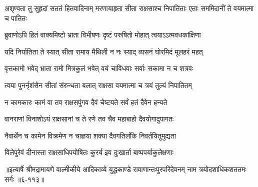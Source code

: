 \threelineshloka
{अशृण्वता तु सुहृदां सततं हितवादिनाम्}
{मरणायाहृता सीता राक्षसाश्च निपातिताः}
{एताः सममिदानीं ते वयमात्मा च पातितः} %

\twolineshloka
{ब्रुवाणोऽपि हितं वाक्यमिष्टो भ्राता विभीषणः}
{दृष्टं परुषितो मोहात् त्वयाऽऽत्मवधकांक्षिणा} %

\twolineshloka
{यदि निर्यातिता ते स्यात् सीता रामाय मैथिली}
{न नः स्याद् व्यसनं घोरमिदं मूलहरं महत्} %

\twolineshloka
{वृत्तकामो भवेद् भ्राता रामो मित्रकुलं भवेत्}
{वयं चाविधवाः सर्वाः सकामा न च शत्रवः} %

\twolineshloka
{त्वया पुनर्नृशंसेन सीतां संरुन्धता बलात्}
{राक्षसा वयमात्मा च त्रयं तुल्यं निपातितम्} %

\twolineshloka
{न कामकारः कामं वा तव राक्षसपुंगव}
{दैवं चेष्टयते सर्वं हतं दैवेन हन्यते} %

\twolineshloka
{वानराणां विनाशोऽयं राक्षसानां च ते रणे}
{तव चैव महाबाहो दैवयोगादुपागतः} %

\twolineshloka
{नैवार्थेन च कामेन विक्रमेण न चाज्ञया}
{शक्या दैवगतिर्लोके निवर्तयितुमुद्यता} %

\twolineshloka
{विलेपुरेवं दीनास्ता राक्षसाधिपयोषितः}
{कुरर्य इव दुःखार्ता बाष्पपर्याकुलेक्षणाः} %


॥इत्यार्षे श्रीमद्रामायणे वाल्मीकीये आदिकाव्ये युद्धकाण्डे रावाणान्तःपुरपरिदेवनम् नाम त्रयोदशाधिकशततमः सर्गः ॥६-११३॥
